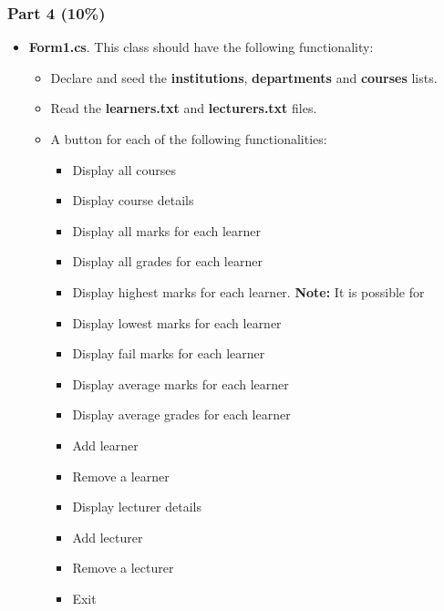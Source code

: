 \documentclass{article}
\begin{document}
\subsubsection*{Part 4 (10\%)}
\begin{itemize}
    \item \textbf{Form1.cs}. This class should have the following functionality:
    \begin{itemize}
        \item Declare and seed the \textbf{institutions}, \textbf{departments} and \textbf{courses} lists.
        \item Read the \textbf{learners.txt} and \textbf{lecturers.txt} files. 
        \item A button for each of the following functionalities:
        \begin{itemize}
            \item Display all courses
            \item Display course details
            \item Display all marks for each learner
            \item Display all grades for each learner
            \item Display highest marks for each learner. \textbf{Note:} It is possible for 
            \item Display lowest marks for each learner
            \item Display fail marks for each learner
            \item Display average marks for each learner
            \item Display average grades for each learner
            \item Add learner
            \item Remove a learner
            \item Display lecturer details
            \item Add lecturer
            \item Remove a lecturer
            \item Exit
        \end{itemize} 
        

\end{itemize}
\end{itemize}
\end{document}
